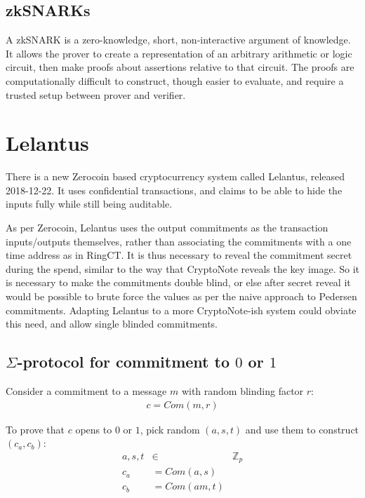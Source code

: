 \documentclass{article}
\begin{document}
\subsection{zkSNARKs}

A zkSNARK is a zero-knowledge, short, non-interactive argument of knowledge.  It allows the prover to create a representation of an arbitrary arithmetic or logic circuit, then make proofs about assertions relative to that circuit.  The proofs are computationally difficult to construct, though easier to evaluate, and require a trusted setup between prover and verifier.



\section{Lelantus}

There is a new Zerocoin based cryptocurrency system called Lelantus, released 2018-12-22.  It uses confidential transactions, and claims to be able to hide the inputs fully while still being auditable.  

As per Zerocoin, Lelantus uses the output commitments as the transaction inputs/outputs themselves, rather than associating the commitments with a one time address as in RingCT.  It is thus necessary to reveal the commitment secret during the spend, similar to the way that CryptoNote reveals the key image.  So it is necessary to make the commitments double blind, or else after secret reveal it would be possible to brute force the values as per the naive approach to Pedersen commitments.  Adapting Lelantus to a more CryptoNote-ish system could obviate this need, and allow single blinded commitments.


\subsection{$\Sigma$-protocol for commitment to $0$ or $1$}

Consider a commitment to a message $m$ with random blinding factor $r$:
\begin{align}
  c=Com(m, r)
\end{align}

To prove that $c$ opens to $0$ or $1$, pick random $(a,s,t)$ and use them to construct $(c_a, c_b)$:
\begin{align}
  a,s,t &\in& \mathbb{Z}_p\\
  c_a &= Com(a, s)\\
  c_b &= Com(am, t)
\end{align}
\end{document}
